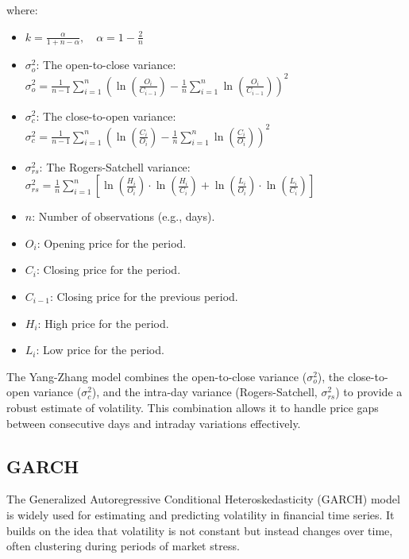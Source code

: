 \documentclass[letterpaper,11pt]{article}
\begin{document}
where:
\begin{itemize}

    \item $k = \frac{\alpha}{1 + n - \alpha}, \quad \alpha = 1 - \frac{2}{n}$

    \item \(\sigma_o^2\): The open-to-close variance: $\sigma_o^2 = \frac{1}{n-1} \sum_{i=1}^n \left( \ln\left(\frac{O_i}{C_{i-1}}\right) - \frac{1}{n} \sum_{i=1}^n \ln\left(\frac{O_i}{C_{i-1}}\right) \right)^2$
    
    \item \(\sigma_c^2\): The close-to-open variance: $\sigma_c^2 = \frac{1}{n-1} \sum_{i=1}^n \left( \ln\left(\frac{C_i}{O_i}\right) - \frac{1}{n} \sum_{i=1}^n \ln\left(\frac{C_i}{O_i}\right) \right)^2$

    \item \(\sigma_{rs}^2\): The Rogers-Satchell variance: $\sigma_{rs}^2 = \frac{1}{n} \sum_{i=1}^n \left[ \ln\left(\frac{H_i}{O_i}\right) \cdot \ln\left(\frac{H_i}{C_i}\right) + \ln\left(\frac{L_i}{O_i}\right) \cdot \ln\left(\frac{L_i}{C_i}\right) \right]$
    

    \item \(n\): Number of observations (e.g., days).
    \item \(O_i\): Opening price for the period.
    \item \(C_i\): Closing price for the period.
    \item \(C_{i-1}\): Closing price for the previous period.
    \item \(H_i\): High price for the period.
    \item \(L_i\): Low price for the period.
    
\end{itemize}


The Yang-Zhang model combines the open-to-close variance (\(\sigma_o^2\)), the close-to-open variance (\(\sigma_c^2\)), and the intra-day variance (Rogers-Satchell, \(\sigma_{rs}^2\)) to provide a robust estimate of volatility. This combination allows it to handle price gaps between consecutive days and intraday variations effectively.



\subsection{GARCH}
The Generalized Autoregressive Conditional Heteroskedasticity (GARCH) model is widely used for estimating and predicting volatility in financial time series. It builds on the idea that volatility is not constant but instead changes over time, often clustering during periods of market stress.
\end{document}
